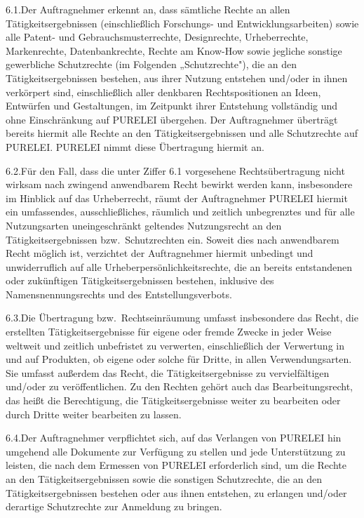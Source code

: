 \documentclass[11pt,a4paper]{article}
\newcommand{\ClientKurzname}{PURELEI}
\begin{document}
6.1.\quad Der Auftragnehmer erkennt an, dass sämtliche Rechte an allen Tätigkeitsergebnissen (einschließlich Forschungs- und Entwicklungsarbeiten) sowie alle Patent- und Gebrauchsmusterrechte, Designrechte, Urheberrechte, Markenrechte, Datenbankrechte, Rechte am Know-How sowie jegliche sonstige gewerbliche Schutzrechte (im Folgenden „Schutzrechte"), die an den Tätigkeitsergebnissen bestehen, aus ihrer Nutzung entstehen und/oder in ihnen verkörpert sind, einschließlich aller denkbaren Rechtspositionen an Ideen, Entwürfen und Gestaltungen, im Zeitpunkt ihrer Entstehung vollständig und ohne Einschränkung auf \ClientKurzname{} übergehen. Der Auftragnehmer überträgt bereits hiermit alle Rechte an den Tätigkeitsergebnissen und alle Schutzrechte auf \ClientKurzname. \ClientKurzname{} nimmt diese Übertragung hiermit an.

6.2.\quad Für den Fall, dass die unter Ziffer 6.1 vorgesehene Rechtsübertragung nicht wirksam nach zwingend anwendbarem Recht bewirkt werden kann, insbesondere im Hinblick auf das Urheberrecht, räumt der Auftragnehmer \ClientKurzname{} hiermit ein umfassendes, ausschließliches, räumlich und zeitlich unbegrenztes und für alle Nutzungsarten uneingeschränkt geltendes Nutzungsrecht an den Tätigkeitsergebnissen bzw.\ Schutzrechten ein. Soweit dies nach anwendbarem Recht möglich ist, verzichtet der Auftragnehmer hiermit unbedingt und unwiderruflich auf alle Urheberpersönlichkeitsrechte, die an bereits entstandenen oder zukünftigen Tätigkeitsergebnissen bestehen, inklusive des Namensnennungsrechts und des Entstellungsverbots.

6.3.\quad Die Übertragung bzw.\ Rechtseinräumung umfasst insbesondere das Recht, die erstellten Tätigkeitsergebnisse für eigene oder fremde Zwecke in jeder Weise weltweit und zeitlich unbefristet zu verwerten, einschließlich der Verwertung in und auf Produkten, ob eigene oder solche für Dritte, in allen Verwendungsarten. Sie umfasst außerdem das Recht, die Tätigkeitsergebnisse zu vervielfältigen und/oder zu veröffentlichen. Zu den Rechten gehört auch das Bearbeitungsrecht, das heißt die Berechtigung, die Tätigkeitsergebnisse weiter zu bearbeiten oder durch Dritte weiter bearbeiten zu lassen.

6.4.\quad Der Auftragnehmer verpflichtet sich, auf das Verlangen von \ClientKurzname{} hin umgehend alle Dokumente zur Verfügung zu stellen und jede Unterstützung zu leisten, die nach dem Ermessen von \ClientKurzname{} erforderlich sind, um die Rechte an den Tätigkeitsergebnissen sowie die sonstigen Schutzrechte, die an den Tätigkeitsergebnissen bestehen oder aus ihnen entstehen, zu erlangen und/oder derartige Schutzrechte zur Anmeldung zu bringen.
\end{document}
